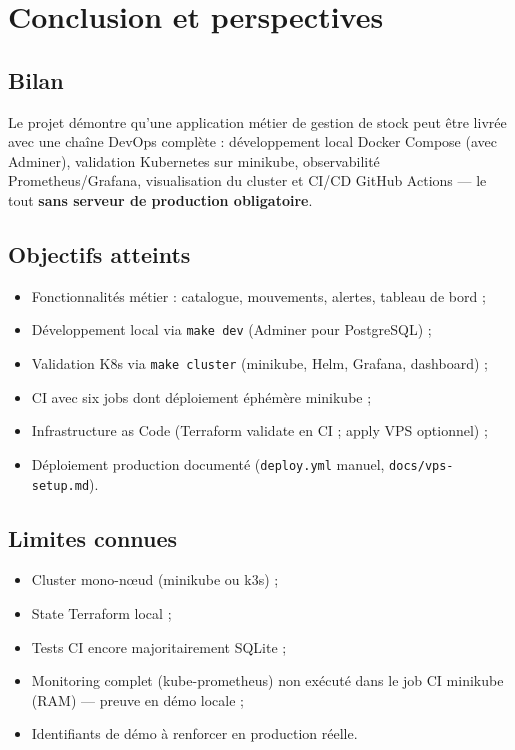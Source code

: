 \chapter{Conclusion et perspectives}
\label{ch:conclusion}

\section{Bilan}

Le projet \stockflow{} démontre qu'une application métier de gestion de stock peut être livrée avec une chaîne DevOps complète : développement local Docker Compose (avec Adminer), validation Kubernetes sur minikube, observabilité Prometheus/Grafana, visualisation du cluster et CI/CD GitHub Actions — le tout \textbf{sans serveur de production obligatoire}.

\section{Objectifs atteints}

\begin{itemize}
  \item Fonctionnalités métier : catalogue, mouvements, alertes, tableau de bord ;
  \item Développement local via \texttt{make dev} (Adminer pour PostgreSQL) ;
  \item Validation K8s via \texttt{make cluster} (minikube, Helm, Grafana, dashboard) ;
  \item CI avec six jobs dont déploiement éphémère minikube ;
  \item Infrastructure as Code (Terraform validate en CI ; apply VPS optionnel) ;
  \item Déploiement production documenté (\texttt{deploy.yml} manuel, \texttt{docs/vps-setup.md}).
\end{itemize}

\section{Limites connues}

\begin{itemize}
  \item Cluster mono-nœud (minikube ou k3s) ;
  \item State Terraform local ;
  \item Tests CI encore majoritairement SQLite ;
  \item Monitoring complet (kube-prometheus) non exécuté dans le job CI minikube (RAM) — preuve en démo locale ;
  \item Identifiants de démo à renforcer en production réelle.
\end{itemize}

